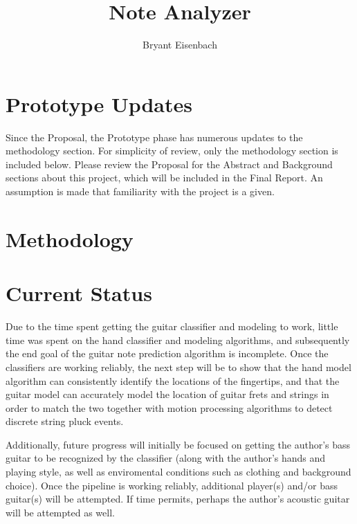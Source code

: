 \documentclass[titlepage]{article}
\author{Bryant Eisenbach}
\title{Note Analyzer}
\begin{document}
%

\section{Prototype Updates}
Since the Proposal, the Prototype phase has numerous updates to the methodology section.
For simplicity of review, only the methodology section is included below.
Please review the Proposal for the Abstract and Background sections about this project,
which will be included in the Final Report.
An assumption is made that familiarity with the project is a given.

\section{Methodology}


\pagebreak
\section{Current Status}
Due to the time spent getting the guitar classifier and modeling to work,
little time was spent on the hand classifier and modeling algorithms,
and subsequently the end goal of the guitar note prediction algorithm is incomplete.
Once the classifiers are working reliably, the next step will be to show that
the hand model algorithm can consistently identify the locations of the fingertips,
and that the guitar model can accurately model the location of guitar frets and strings
in order to match the two together with motion processing algorithms to detect discrete
string pluck events.

Additionally, future progress will initially be focused on getting the author's bass guitar to be recognized by the classifier
(along with the author's hands and playing style, as well as enviromental conditions such as clothing and background choice).
Once the pipeline is working reliably, additional player(s) and/or bass guitar(s) will
be attempted. If time permits, perhaps the author's acoustic guitar will be attempted as well.

{}

\end{document}
